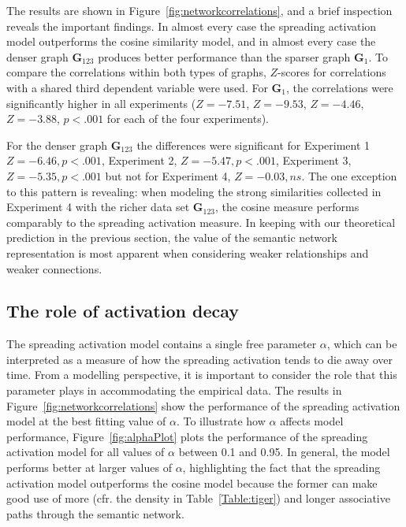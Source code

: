 \documentclass[doc]{apa6}
\begin{document}
The results are shown in Figure~\ref{fig:networkcorrelations}, and a brief inspection reveals the important findings. In almost every case the spreading activation model outperforms the cosine similarity model, and in almost every case the denser graph $\mathbf{G}_{123}$ produces better performance than the sparser graph $\mathbf{G}_1$. To compare the correlations within both types of graphs, $Z$-scores for correlations with a shared third dependent variable \parencite{Steiger1980} were used. For $\mathbf{G}_{1}$, the correlations were significantly higher in all experiments ($Z = -7.51$, $Z = -9.53$, $Z = -4.46$,$Z = -3.88$,  $p < .001$ for each of the four experiments).

For the denser graph $\mathbf{G}_{123}$ the differences were significant for Experiment 1 $Z = -6.46, p < .001$, Experiment 2, $Z = -5.47, p < .001$, Experiment 3, $Z = -5.35, p < .001$ but not for Experiment 4, $Z = -0.03, ns$. The one exception to this pattern is revealing: when modeling the strong similarities collected in Experiment 4 with the richer data set $\mathbf{G}_{123}$, the cosine measure performs comparably to the spreading activation measure. In keeping with our theoretical prediction in the previous section, the value of the semantic network representation is most apparent when considering weaker relationships and weaker connections.


\subsection{The role of activation decay}

The spreading activation model contains a single free parameter $\alpha$, which can be interpreted as a measure of how the spreading activation tends to die away over time. From a modelling perspective, it is important to consider the role that this parameter plays in accommodating the empirical data. The results in Figure~\ref{fig:networkcorrelations} show the performance of the spreading activation model at the best fitting value of $\alpha$. To illustrate how $\alpha$ affects model performance, Figure~\ref{fig:alphaPlot} plots the performance of the spreading activation model for all values of $\alpha$ between 0.1 and 0.95. In general, the model performs better at larger values of $\alpha$, highlighting the fact that the spreading activation model outperforms the cosine model because the former can make good use of more (cfr. the density in Table~\ref{Table:tiger}) and longer associative paths through the semantic network.
\end{document}

